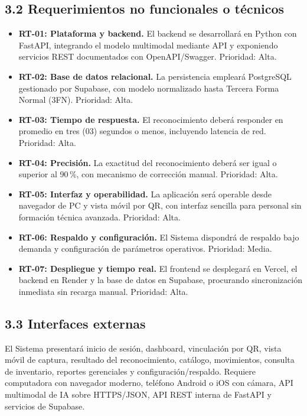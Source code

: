 \documentclass[12pt, letterpaper]{report}
\begin{document}
\subsection*{3.2 Requerimientos no funcionales o técnicos}

\begin{itemize}[leftmargin=*]
  \item \textbf{RT-01: Plataforma y backend.} El backend se desarrollará en Python con FastAPI, integrando el modelo multimodal mediante API y exponiendo servicios REST documentados con OpenAPI/Swagger. Prioridad: Alta.
  \item \textbf{RT-02: Base de datos relacional.} La persistencia empleará PostgreSQL gestionado por Supabase, con modelo normalizado hasta Tercera Forma Normal (3FN). Prioridad: Alta.
  \item \textbf{RT-03: Tiempo de respuesta.} El reconocimiento deberá responder en promedio en tres (03) segundos o menos, incluyendo latencia de red. Prioridad: Alta.
  \item \textbf{RT-04: Precisión.} La exactitud del reconocimiento deberá ser igual o superior al 90\,\%, con mecanismo de corrección manual. Prioridad: Alta.
  \item \textbf{RT-05: Interfaz y operabilidad.} La aplicación será operable desde navegador de PC y vista móvil por QR, con interfaz sencilla para personal sin formación técnica avanzada. Prioridad: Alta.
  \item \textbf{RT-06: Respaldo y configuración.} El Sistema dispondrá de respaldo bajo demanda y configuración de parámetros operativos. Prioridad: Media.
  \item \textbf{RT-07: Despliegue y tiempo real.} El frontend se desplegará en Vercel, el backend en Render y la base de datos en Supabase, procurando sincronización inmediata sin recarga manual. Prioridad: Alta.
\end{itemize}

\subsection*{3.3 Interfaces externas}

El Sistema presentará inicio de sesión, dashboard, vinculación por QR,
vista móvil de captura, resultado del reconocimiento, catálogo,
movimientos, consulta de inventario, reportes gerenciales y
configuración/respaldo. Requiere computadora con navegador moderno,
teléfono Android o iOS con cámara, API multimodal de IA sobre
HTTPS/JSON, API REST interna de FastAPI y servicios de Supabase.
\end{document}
